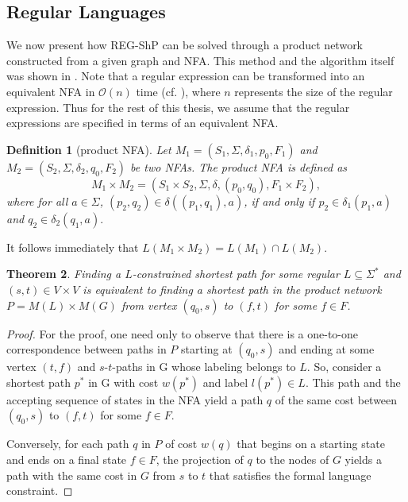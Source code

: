 \documentclass[]{article}
\newtheorem{theorem}{Theorem}[section]
\newtheorem{definition}[theorem]{Definition}
\numberwithin{equation}{section}
\begin{document}
\subsection{Regular Languages}
\label{sec:shp:reg}

We now present how REG-ShP can be solved through a product network constructed from a given graph and NFA. This method and the algorithm itself was shown in \cite{BJM00}. Note that a regular expression can be transformed into an equivalent NFA in $\mathcal{O}(n)$ time (cf. \cite{HMU06}), where $n$ represents the size of the regular expression. Thus for the rest of this thesis, we assume that the regular expressions are specified in terms of an equivalent NFA.

\begin{definition}[product NFA]
	\label{def:productnfa}
	\sloppy Let $M_1 = (S_1, \Sigma, \delta_1, p_0, F_1)$ and $M_2 = (S_2, \Sigma, \delta_2, q_0, F_2)$ be two NFAs. The product NFA is defined as
	$$M_1 \times M_2 = (S_1 \times S_2, \Sigma, \delta, (p_0, q_0), F_1 \times F_2),$$
	where for all $a\in \Sigma$, $(p_2, q_2)\in \delta((p_1, q_1), a) $, if and only if $p_2 \in \delta_1(p_1, a)$ and $q_2 \in \delta_2(q_1, a).$
\end{definition}

It follows immediately that $L(M_1\times M_2) = L(M_1)\cap L(M_2)$.

\begin{theorem}
	\label{thm:productnfa}
	Finding a $L$-constrained shortest path for some regular $L \subseteq \Sigma^*$ and $(s, t) \in V \times V$ is equivalent to finding a shortest path in the product network $P = M(L) \times M(G)$ from vertex $(q_0, s)$ to $(f, t)$ for some $f \in F$.
\end{theorem}
\begin{proof}
	For the proof, one need only to observe that there is a one-to-one correspondence between paths in $P$ starting at $(q_0, s)$ and ending at some vertex $(t, f)$ and $s$-$t$-paths in G whose labeling belongs to $L$. So, consider a shortest path $p^*$ in G with cost $w(p^*)$ and label $l(p^*) \in L$. This path and the accepting sequence of states in the NFA yield a path $q$ of the same cost between $(q_0, s)$ to $(f, t)$ for some $f \in F$.
	
	Conversely, for each path $q$ in $P$ of cost $w(q)$ that begins on a starting state and ends on a final state $f \in F$, the projection of $q$ to the nodes of $G$ yields a path with the same cost in $G$ from $s$ to $t$ that satisfies the formal language constraint.
\end{proof}
\end{document}
